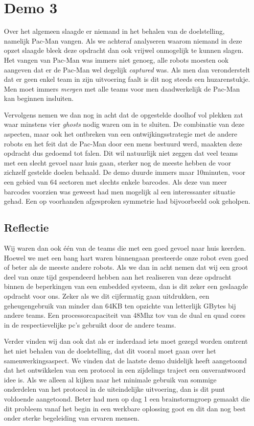 \documentclass[12pt,a4paper]{report}
\begin{document}
\section{Demo 3}

Over het algemeen slaagde er niemand in het behalen van de doelstelling, namelijk Pac-Man vangen. Als we achteraf analyseren waarom niemand in deze opzet slaagde bleek deze opdracht dan ook vrijwel onmogelijk te kunnen slagen. Het vangen van Pac-Man was immers niet genoeg, alle robots moesten ook aangeven dat er de Pac-Man wel degelijk \emph{captured} was. Als men dan veronderstelt dat er geen enkel team in zijn uitvoering faalt is dit nog steeds een huzarenstukje. Men moet immers \emph{mergen} met alle teams voor men daadwerkelijk de Pac-Man kan beginnen insluiten.

Vervolgens nemen we dan nog in acht dat de opgestelde doolhof vol plekken zat waar minstens vier \emph{ghosts} nodig waren om in te sluiten. De combinatie van deze aspecten, maar ook het ontbreken van een ontwijkingsstrategie met de andere robots en het feit dat de Pac-Man door een mens bestuurd werd, maakten deze opdracht dus gedoemd tot falen. Dit wil natuurlijk niet zeggen dat veel teams met een slecht gevoel naar huis gaan, sterker nog de meeste hebben de voor zichzelf gestelde doelen behaald.  De demo duurde immers maar 10minuten, voor een gebied van 64 sectoren met slechts enkele barcodes. Als deze van meer barcodes voorzien was geweest had men mogelijk al een interessanter situatie gehad. Een op voorhanden afgesproken symmetrie had bijvoorbeeld ook geholpen.

\subsection{Reflectie}

Wij waren dan ook \'e\'en van de teams die met een goed gevoel naar huis keerden. Hoewel we met een bang hart waren binnengaan presteerde onze robot even goed of beter als de meeste andere robots. Als we dan in acht nemen dat wij een groot deel van onze tijd gespendeerd hebben aan het realiseren van deze opdracht binnen de beperkingen van een embedded systeem, dan is dit zeker een geslaagde opdracht voor ons. Zeker als we dit cijfermatig gaan uitdrukken, een geheugengebruik van minder dan 64KB ten opzichte van letterlijk GBytes bij andere teams. Een processorcapaciteit van 48Mhz tov van de dual en quad cores in de respectievelijke pc's gebruikt door de andere teams.

Verder vinden wij dan ook dat als er inderdaad iets moet gezegd worden omtrent het niet behalen van de doelstelling, dat dit vooral moet gaan over het samenwerkingsaspect. We vinden dat de laatste demo duidelijk heeft aangetoond dat het ontwikkelen van een protocol in een zijdelings traject een onverantwoord idee is. Als we alleen al kijken naar het minimale gebruik van sommige onderdelen van het protocol in de uiteindelijke uitvoering, dan is dit punt voldoende aangetoond. Beter had men op dag 1 een brainstormgroep gemaakt die dit probleem vanaf het begin in een werkbare oplossing goot en dit dan nog best onder sterke begeleiding van ervaren mensen.
\end{document}
